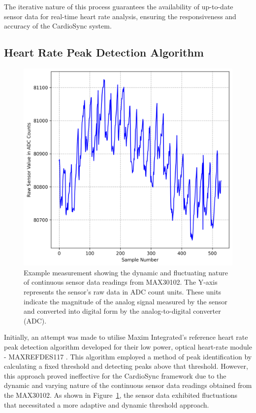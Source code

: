 \noindent The iterative nature of this process guarantees the availability of up-to-date sensor data for real-time heart rate analysis, ensuring the responsiveness and accuracy of the CardioSync system.


\subsection{Heart Rate Peak Detection Algorithm}
\label{sec:heart_rate_algo_impl}

\begin{figure}[t]
    \centering
    \includegraphics[width=0.7\linewidth]{chapters/Implementation/dynamic_threshold.png}
    \caption{Example measurement showing the dynamic and fluctuating nature of continuous sensor data readings from MAX30102. The Y-axis represents the sensor's raw data in ADC count units. These units indicate the magnitude of the analog signal measured by the sensor and converted into digital form by the analog-to-digital converter (ADC).}
    \label{fig:dynamic_threshold}
\end{figure}
\noindent Initially, an attempt was made to utilise Maxim Integrated's reference heart rate peak detection algorithm \cite{SparkFun_MAX3010x_Sensor_Library} developed for their low power, optical heart-rate module - MAXREFDES117 \cite{2016maxrefdes117}. This algorithm employed a method of peak identification by calculating a fixed threshold and detecting peaks above that threshold. However, this approach proved ineffective for the CardioSync framework due to the dynamic and varying nature of the continuous sensor data readings obtained from the MAX30102. As shown in Figure~\ref{fig:dynamic_threshold}, the sensor data exhibited fluctuations that necessitated a more adaptive and dynamic threshold approach.
\vspace{1\baselineskip}

